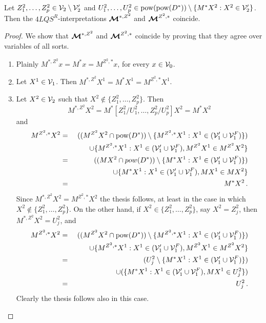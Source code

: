\documentclass{fundam}
\newcommand{\model}{\ensuremath{\mbox{\boldmath $\mathcal{M}$}}\xspace}
\newcommand{\pow}{\mbox{\rm pow}}
\newcommand{\QLQSR}{\ensuremath{\mbox{$4\mathit{LQS}^{R}$}}\xspace}
\begin{document}
\begin{lemma}
\label{le_eqM*ZMZ*2}
Let $Z_{1}^2,\ldots,Z_{p}^2 \in {\cal V}_{2} \setminus {\cal V}'_{2}$
and $U_{1}^2,\ldots,U_{p}^2 \in \pow(\pow(D^*)) \setminus \{M^{*}X^2 :
X^2 \in {\cal V}'_{2}\}$.  Then the $\QLQSR$-interpretations
$\model^{*,Z^2}$ and $\model^{Z^2,*}$ coincide.\end{lemma}
\begin{proof}
We show that $\model^{*,Z^2}$ and $\model^{Z^2,*}$
coincide by proving that they agree over variables of all sorts.
\begin{enumerate}
\item Plainly $M^{*,Z^2}x = M^{*}x = M^{Z^2,*}x$, for every $x \in
{\cal V}_0$.

\item Let $X^1 \in {\cal V}_1$. Then $M^{*,Z^2}X^1 = M^{*}X^1 =
M^{Z^2,*}X^1$.

\item  Let $X^2 \in {\cal V}_2$ such that $X^2 \notin
\{Z_1^2,\ldots,Z_p^2\}$. Then
\[M^{*,Z^2}X^2 = M^{*}[Z_1^2/U_1^2,\ldots,Z_p^2/U_p^2]X^2 = M^{*}X^2
\]
and
\begin{eqnarray*}
    M^{Z^2,*}X^2 & = & ((M^{Z^2} X^2 \cap \pow(D^*)) \setminus \{M^{Z^2,*}X^1 : X^1 \in ({\cal V}'_{1}\cup {\cal V}_{1}^{F})\})\\
	     &   &  \qquad\cup \{M^{Z^2,*}X^1 : X^1 \in ({\cal V}'_{1}\cup {\cal V}_{1}^{F}), M^{Z^2}X^1 \in M^{Z^2}X^2\} \\
	     & = & ((MX^2 \cap pow(D^*)) \setminus \{M^{*}X^1 : X^1 \in ({\cal V}'_{1}\cup {\cal V}_{1}^{F})\}) \\
	     &   &  \qquad\cup \{M^{*}X^1 : X^1 \in ({\cal V}'_{1}\cup {\cal V}_{1}^{F}), MX^1 \in MX^2\}\\
	     & = & M^{*}X^2 \,.
\end{eqnarray*}
Since $M^{*,Z^2}X^2 = M^{Z^2,*}X^2$ the thesis follows, at least in
the case in which $X^2 \notin \{Z_1^2,\ldots,Z_p^2\}$.
On the other
hand, if $X^2 \in \{Z_1^2,\ldots,Z_p^2\}$, say $X^2 = Z_j^2$, then
$M^{*,Z^2}X^2 = U_{j}^2$, and
\begin{eqnarray*}
    M^{Z^2,*}X^2 & = & ((M^{Z^2} X^2 \cap \pow(D^*)) \setminus \{M^{Z^2,*}X^1 : X^1 \in ({\cal V}'_{1}\cup {\cal V}_{1}^{F})\})\\
	     &   &  \qquad\cup \{M^{Z^2,*}X^1 : X^1 \in ({\cal V}'_{1}\cup {\cal V}_{1}^{F}), M^{Z^2}X^1 \in M^{Z^2}X^2\} \\
	     & = & (U_{j}^2  \setminus \{M^{*}X^1 : X^1 \in ({\cal V}'_{1}\cup {\cal V}_{1}^{F})\}) \\
	     &   &  \qquad\cup (\{M^{*}X^1 : X^1 \in ({\cal V}'_{1}\cup {\cal V}_{1}^{F}), MX^1 \in U_{j}^2\} )\\
	     & = & U_{j}^2 \,.
\end{eqnarray*}
Clearly the thesis follows also in this case.


\end{enumerate}
\end{proof}
\end{document}
